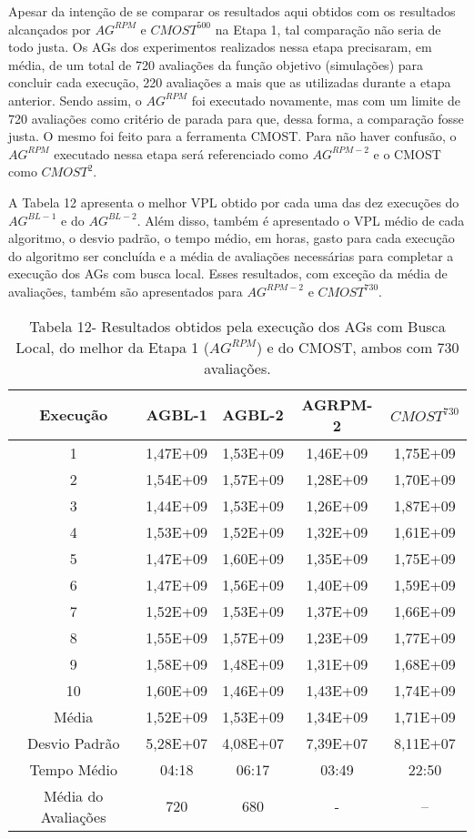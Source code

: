 Apesar da intenção de se comparar os resultados aqui obtidos com os resultados alcançados por $AG^{RPM}$ e  $CMOST^{500}$ na Etapa 1, tal comparação não seria de todo justa. Os AGs dos experimentos realizados nessa etapa precisaram, em média, de um total de 720 avaliações da função objetivo (simulações) para concluir cada execução, 220 avaliações a mais que as utilizadas durante a etapa anterior. Sendo assim, o $AG^{RPM}$ foi executado novamente, mas com um limite de 720 avaliações como critério de parada para que, dessa forma, a comparação fosse justa. O mesmo foi feito para a ferramenta CMOST. Para não haver confusão, o $AG^{RPM}$ executado nessa etapa será referenciado como $AG^{RPM-2}$ e o CMOST como $CMOST^{2}$. 

A Tabela 12 apresenta o melhor VPL obtido por cada uma das dez execuções do $AG^{BL-1}$ e do $AG^{BL-2}$. Além disso, também é apresentado o VPL médio de cada algoritmo, o desvio padrão, o tempo médio, em horas, gasto para cada execução do algoritmo ser concluída e a média de avaliações necessárias para completar a execução dos AGs com busca local. Esses resultados, com exceção da média de avaliações, também são apresentados para $AG^{RPM-2}$ e $CMOST^730$.

\begin{table}[H]
\centering
\caption{Tabela 12- Resultados obtidos pela execução dos AGs com Busca Local, do melhor da Etapa 1 ($AG^{RPM}$) e do CMOST, ambos com 730 avaliações.}

\begin{tabular}{|c|c|c|c|c|}
\hline
Execução & AGBL-1 & AGBL-2 & AGRPM-2 & $CMOST^730$ \\ \hline
1 & 1,47E+09 & 1,53E+09 & 1,46E+09 & 1,75E+09 \\ \hline
2 & 1,54E+09 & 1,57E+09 & 1,28E+09 & 1,70E+09 \\ \hline
3 & 1,44E+09 & 1,53E+09	& 1,26E+09 & 1,87E+09 \\ \hline
4 & 1,53E+09 & 1,52E+09 & 1,32E+09 & 1,61E+09 \\ \hline
5 & 1,47E+09 & 1,60E+09 & 1,35E+09 & 1,75E+09 \\ \hline
6 & 1,47E+09 & 1,56E+09 & 1,40E+09 & 1,59E+09 \\ \hline
7 & 1,52E+09 & 1,53E+09 & 1,37E+09 & 1,66E+09 \\ \hline
8 & 1,55E+09 & 1,57E+09 & 1,23E+09 & 1,77E+09 \\ \hline
9 & 1,58E+09 & 1,48E+09 & 1,31E+09 & 1,68E+09 \\ \hline
10 & 1,60E+09 & 1,46E+09 & 1,43E+09 & 1,74E+09\\ \hline
Média & 1,52E+09 & 1,53E+09 & 1,34E+09 & 1,71E+09\\ \hline
Desvio Padrão & 5,28E+07 & 4,08E+07 & 7,39E+07 & 8,11E+07\\ \hline
Tempo Médio & 04:18 & 06:17 & 03:49 & 22:50\\ \hline
Média do Avaliações & 720 & 680	 & - & --\\ \hline

\end{tabular}
\end{table}


